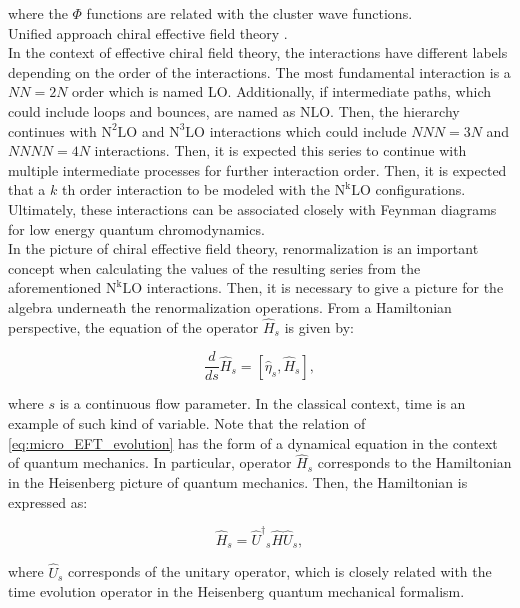 \documentclass[openany]{book}
\begin{document}
where the $\Phi$ functions are related with the cluster wave functions. \\

Unified approach chiral effective field theory  \cite{navratil_quaglioni_hupin_romero-redondo_calci_2016}. \\

In the context of effective chiral field theory, the interactions have different labels depending on the order of the interactions. The most fundamental interaction is a $NN = 2N$ order which is named LO. Additionally, if intermediate paths, which could include loops and bounces, are named as $\mathrm{NLO}$. Then, the hierarchy continues with $\mathrm{N^2LO}$ and $\mathrm{N^3LO}$ interactions which could include $NNN = 3N$ and $NNNN = 4N$ interactions. Then, it is expected this series to continue with multiple intermediate processes for further interaction order.  Then, it is expected that a $k$ th order interaction to be modeled with the $\mathrm{N^kLO}$ configurations. Ultimately, these interactions can be associated closely with Feynman diagrams for low energy quantum chromodynamics. \\

In the picture of chiral effective field theory, renormalization is an important concept when calculating the values of the resulting series from the aforementioned $\mathrm{N^kLO}$ interactions. Then, it is necessary to give a picture for the algebra underneath the renormalization operations. From a Hamiltonian perspective, the equation of the operator $\hat H_s$ is given by: 

\begin{equation}\label{eq:micro_EFT_evolution}
	\frac{d}{ds}\hat H_s = [\hat \eta_s, \hat H_s],
\end{equation}

where $s$ is a continuous flow parameter. In the classical context, time is an example of such kind of variable. Note that the relation of \ref{eq:micro_EFT_evolution} has the form of a dynamical equation in the context of quantum mechanics. In particular, operator $\hat H_s$ corresponds to the Hamiltonian in the Heisenberg picture of quantum mechanics. Then, the Hamiltonian is expressed as: 

 \begin{equation}\label{eq:micro_EFT_hamiltonian_heisenberg}
	\hat H_s = {{\hat U}^{\dagger}}_s \hat H \hat U_s,
 \end{equation}

where $\hat U_s$ corresponds of the unitary operator, which is closely related with the time evolution operator in the Heisenberg quantum mechanical formalism. \\
\end{document}
